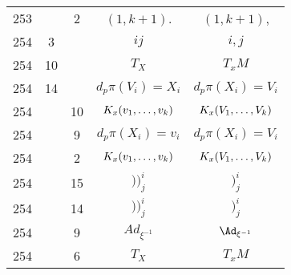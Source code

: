 \documentclass[a4paper,11pt]{article}
\begin{document}
\begin{center}
\begin{tabular}{|c|c|c|c|c|}
    253 & &  2 & $( 1, k + 1 )$. & $( 1, k + 1 )$, \\
    254 &  3 & & $ij$ & $i, j$ \\
    254 & 10 & & $T_{ X }$ & $T_{ x }M$ \\
    254 & 14 & & $d_{ p }\pi( V_{ i } ) = X_{ i }$ & $d_{ p }\pi( X_{ i } )
                                                     = V_{ i }$ \\
    254 & & 10 & $K_{ x }( v_{ 1 }, \ldots, v_{ k } )$ & $K_{ x }( V_{ 1 },
                                                      \ldots, V_{ k } )$ \\
    254 & &  9 & $d_{ p }\pi( X_{ i } ) = v_{ i }$ & $d_{ p }\pi( X_{ i } )
                                                     = V_{ i }$ \\
    254 & &  2 & $K_{ x }( v_{ 1 }, \ldots, v_{ k } )$ & $K_{ x }( V_{ 1 },
                                                      \ldots, V_{ k } )$ \\
    254 & & 15 & $) )^{ i }_{ j }$ & $)^{ i }_{ j }$ \\
    254 & & 14 & $) )^{ i }_{ j }$ & $)^{ i }_{ j }$ \\
    254 & &  9 & $Ad_{ \xi^{ -1 } }$ & $\Ad_{ \xi^{ -1 } }$ \\
    254 & &  6 & $T_{ X }$ & $T_{ x }M$ \\
    \hline
  \end{tabular}


\end{center}
\end{document}
